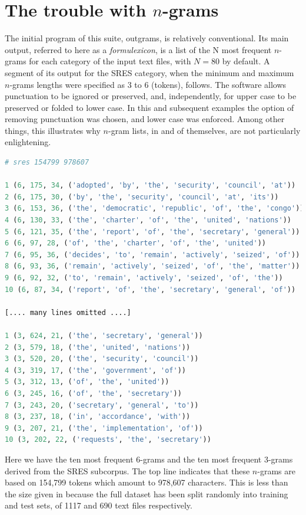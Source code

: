 \documentclass[output=paper]{langscibook}
\begin{document}
\section{The trouble with $n$-grams}

The initial program of this suite, outgrams, is relatively conventional. Its main output, referred to here as a \textit{formulexicon}, is a list of the N most frequent $n$-grams for each category of the input text files, with $N=80$ by default. A segment of its output for the SRES category, when the minimum and maximum $n$-grams lengths were specified as 3 to 6 (tokens), follows. The software allows punctuation to be ignored or preserved, and, independently, for upper case to be preserved or folded to lower case. In this and subsequent examples the option of removing punctuation was chosen, and lower case was enforced. Among other things, this illustrates why $n$-gram lists, in and of themselves, are not particularly enlightening.

\begin{lstlisting}[language=Python,basicstyle=\footnotesize\ttfamily]
# sres 154799 978607

1 (6, 175, 34, ('adopted', 'by', 'the', 'security', 'council', 'at'))
2 (6, 175, 30, ('by', 'the', 'security', 'council', 'at', 'its'))
3 (6, 153, 36, ('the', 'democratic', 'republic', 'of', 'the', 'congo'))
4 (6, 130, 33, ('the', 'charter', 'of', 'the', 'united', 'nations'))
5 (6, 121, 35, ('the', 'report', 'of', 'the', 'secretary', 'general'))
6 (6, 97, 28, ('of', 'the', 'charter', 'of', 'the', 'united'))
7 (6, 95, 36, ('decides', 'to', 'remain', 'actively', 'seized', 'of'))
8 (6, 93, 36, ('remain', 'actively', 'seized', 'of', 'the', 'matter'))
9 (6, 92, 32, ('to', 'remain', 'actively', 'seized', 'of', 'the'))
10 (6, 87, 34, ('report', 'of', 'the', 'secretary', 'general', 'of'))

[.... many lines omitted ....]

1 (3, 624, 21, ('the', 'secretary', 'general'))
2 (3, 579, 18, ('the', 'united', 'nations'))
3 (3, 520, 20, ('the', 'security', 'council'))
4 (3, 319, 17, ('the', 'government', 'of'))
5 (3, 312, 13, ('of', 'the', 'united'))
6 (3, 245, 16, ('of', 'the', 'secretary'))
7 (3, 243, 20, ('secretary', 'general', 'to'))
8 (3, 237, 18, ('in', 'accordance', 'with'))
9 (3, 207, 21, ('the', 'implementation', 'of'))
10 (3, 202, 22, ('requests', 'the', 'secretary'))
\end{lstlisting}

Here we have the ten most frequent 6-grams and the ten most frequent 3-grams derived from the SRES subcorpus. The top line indicates that these $n$-grams are based on 154,799 tokens which amount to 978,607 characters. This is less than the size given in  because the full dataset has been split randomly into training and test sets, of 1117 and 690 text files respectively.
\end{document}
